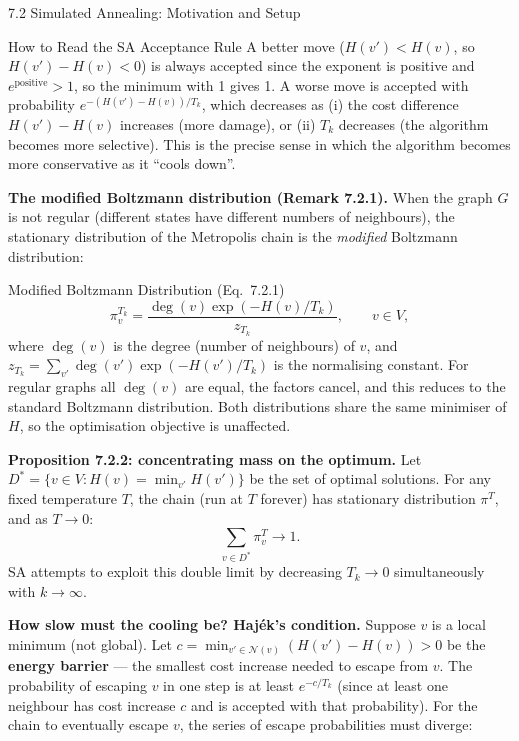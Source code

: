 \documentclass[aspectratio=169,10pt]{beamer}
\newcommand{\calN}{\mathcal{N}}
\begin{document}
\begin{frame}[allowframebreaks]{7.2 Simulated Annealing: Motivation and Setup}
\begin{alertblock}{How to Read the SA Acceptance Rule}
  A better move ($H(v') < H(v)$, so $H(v')-H(v) < 0$) is always accepted
  since the exponent is positive and $e^{\text{positive}} > 1$, so the
  minimum with 1 gives 1.  A worse move is accepted with probability
  $e^{-(H(v')-H(v))/T_k}$, which decreases as (i) the cost difference
  $H(v') - H(v)$ increases (more damage), or (ii) $T_k$ decreases (the
  algorithm becomes more selective).  This is the precise sense in which
  the algorithm becomes more conservative as it ``cools down''.
\end{alertblock}

\framebreak

\textbf{The modified Boltzmann distribution (Remark 7.2.1).}
When the graph $G$ is not regular (different states have different numbers
of neighbours), the stationary distribution of the Metropolis chain is the
\emph{modified} Boltzmann distribution:

\begin{block}{Modified Boltzmann Distribution (Eq.~7.2.1)}
  \[
    \pi^{T_k}_v = \frac{\deg(v)\exp(-H(v)/T_k)}{z_{T_k}}, \qquad v \in V,
  \]
  where $\deg(v)$ is the degree (number of neighbours) of $v$, and
  $z_{T_k} = \sum_{v'} \deg(v')\exp(-H(v')/T_k)$ is the normalising
  constant.  For regular graphs all $\deg(v)$ are equal, the factors cancel,
  and this reduces to the standard Boltzmann distribution.  Both
  distributions share the same minimiser of $H$, so the optimisation
  objective is unaffected.
\end{block}

\textbf{Proposition 7.2.2: concentrating mass on the optimum.}
Let $D^* = \{v \in V : H(v) = \min_{v'} H(v')\}$ be the set of optimal
solutions.  For any fixed temperature $T$, the chain (run at $T$ forever)
has stationary distribution $\pi^T$, and as $T \to 0$:
\[
  \sum_{v \in D^*} \pi^T_v \to 1.
\]
SA attempts to exploit this double limit by decreasing $T_k \to 0$
simultaneously with $k \to \infty$.

\framebreak

\textbf{How slow must the cooling be? Haj\'{e}k's condition.}
Suppose $v$ is a local minimum (not global).  Let
$c = \min_{v' \in \calN(v)} (H(v') - H(v)) > 0$ be the \textbf{energy
barrier} --- the smallest cost increase needed to escape from $v$.  The
probability of escaping $v$ in one step is at least $e^{-c/T_k}$ (since at
least one neighbour has cost increase $c$ and is accepted with that
probability).  For the chain to eventually escape $v$, the series of escape
probabilities must diverge:


\end{frame}
\end{document}

